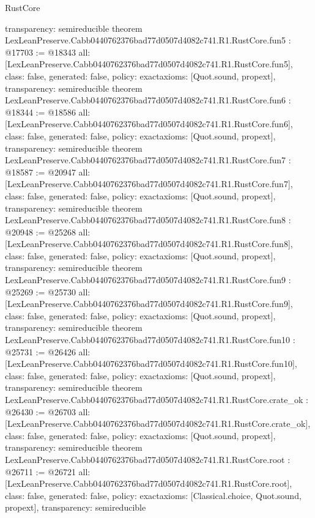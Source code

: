 \begin{lexlean}{RustCore}
\begin{coremodule}
{  transparency: semireducible
}
theorem LexLeanPreserve.Cabb0440762376bad77d0507d4082c741.R1.RustCore.fun5 : @17703 := @18343 {
  all: [LexLeanPreserve.Cabb0440762376bad77d0507d4082c741.R1.RustCore.fun5],
  class: false,
  generated: false,
  policy: exact{axioms: [Quot.sound, propext]},
  transparency: semireducible
}
theorem LexLeanPreserve.Cabb0440762376bad77d0507d4082c741.R1.RustCore.fun6 : @18344 := @18586 {
  all: [LexLeanPreserve.Cabb0440762376bad77d0507d4082c741.R1.RustCore.fun6],
  class: false,
  generated: false,
  policy: exact{axioms: [Quot.sound, propext]},
  transparency: semireducible
}
theorem LexLeanPreserve.Cabb0440762376bad77d0507d4082c741.R1.RustCore.fun7 : @18587 := @20947 {
  all: [LexLeanPreserve.Cabb0440762376bad77d0507d4082c741.R1.RustCore.fun7],
  class: false,
  generated: false,
  policy: exact{axioms: [Quot.sound, propext]},
  transparency: semireducible
}
theorem LexLeanPreserve.Cabb0440762376bad77d0507d4082c741.R1.RustCore.fun8 : @20948 := @25268 {
  all: [LexLeanPreserve.Cabb0440762376bad77d0507d4082c741.R1.RustCore.fun8],
  class: false,
  generated: false,
  policy: exact{axioms: [Quot.sound, propext]},
  transparency: semireducible
}
theorem LexLeanPreserve.Cabb0440762376bad77d0507d4082c741.R1.RustCore.fun9 : @25269 := @25730 {
  all: [LexLeanPreserve.Cabb0440762376bad77d0507d4082c741.R1.RustCore.fun9],
  class: false,
  generated: false,
  policy: exact{axioms: [Quot.sound, propext]},
  transparency: semireducible
}
theorem LexLeanPreserve.Cabb0440762376bad77d0507d4082c741.R1.RustCore.fun10 : @25731 := @26426 {
  all: [LexLeanPreserve.Cabb0440762376bad77d0507d4082c741.R1.RustCore.fun10],
  class: false,
  generated: false,
  policy: exact{axioms: [Quot.sound, propext]},
  transparency: semireducible
}
theorem LexLeanPreserve.Cabb0440762376bad77d0507d4082c741.R1.RustCore.crate_ok : @26430 := @26703 {
  all: [LexLeanPreserve.Cabb0440762376bad77d0507d4082c741.R1.RustCore.crate_ok],
  class: false,
  generated: false,
  policy: exact{axioms: [Quot.sound, propext]},
  transparency: semireducible
}
theorem LexLeanPreserve.Cabb0440762376bad77d0507d4082c741.R1.RustCore.root : @26711 := @26721 {
  all: [LexLeanPreserve.Cabb0440762376bad77d0507d4082c741.R1.RustCore.root],
  class: false,
  generated: false,
  policy: exact{axioms: [Classical.choice, Quot.sound, propext]},
  transparency: semireducible
}


\end{coremodule}
\end{lexlean}
